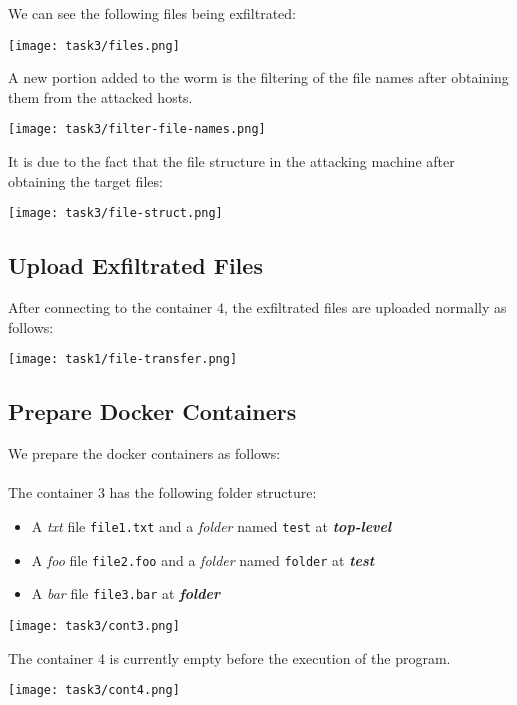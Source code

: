 \documentclass{article}
\begin{document}
We can see the following files being exfiltrated:
\begin{center}
    \texttt{[image: task3/files.png]}
\end{center}

A new portion added to the worm is the filtering of the file names after obtaining them from the attacked hosts.
\begin{center}
    \texttt{[image: task3/filter-file-names.png]}
\end{center}

It is due to the fact that the file structure in the attacking machine after obtaining the target files:
\begin{center}
    \texttt{[image: task3/file-struct.png]}
\end{center}


\subsection{Upload Exfiltrated Files}
After connecting to the container $4$, the exfiltrated files are uploaded normally as follows: 
\begin{center}
    \texttt{[image: task1/file-transfer.png]}
\end{center}


\subsection{Prepare Docker Containers}
We prepare the docker containers as follows:\\\\
The container $3$ has the following folder structure:
\begin{itemize}
    \item A \textit{txt} file \texttt{file1.txt} and a \textit{folder} named \texttt{test} at \textbf{\textit{top-level}}
    \item A \textit{foo} file \texttt{file2.foo} and a \textit{folder} named \texttt{folder} at \textbf{\textit{test}}
    \item A \textit{bar} file \texttt{file3.bar} at \textbf{\textit{folder}}
\end{itemize}
\begin{center}
    \texttt{[image: task3/cont3.png]}
\end{center}
The container $4$ is currently empty before the execution of the program.
\begin{center}
    \texttt{[image: task3/cont4.png]}
\end{center}
\end{document}
